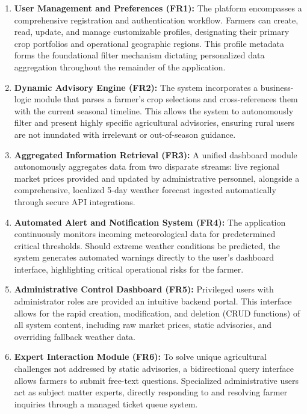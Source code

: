 \begin{enumerate}
    \item \textbf{User Management and Preferences (FR1):} The platform encompasses a comprehensive registration and authentication workflow. Farmers can create, read, update, and manage customizable profiles, designating their primary crop portfolios and operational geographic regions. This profile metadata forms the foundational filter mechanism dictating personalized data aggregation throughout the remainder of the application.
    
    \item \textbf{Dynamic Advisory Engine (FR2):} The system incorporates a business-logic module that parses a farmer's crop selections and cross-references them with the current seasonal timeline. This allows the system to autonomously filter and present highly specific agricultural advisories, ensuring rural users are not inundated with irrelevant or out-of-season guidance.

    \item \textbf{Aggregated Information Retrieval (FR3):} A unified dashboard module autonomously aggregates data from two disparate streams: live regional market prices provided and updated by administrative personnel, alongside a comprehensive, localized 5-day weather forecast ingested automatically through secure API integrations.

    \item \textbf{Automated Alert and Notification System (FR4):} The application continuously monitors incoming meteorological data for predetermined critical thresholds. Should extreme weather conditions be predicted, the system generates automated warnings directly to the user's dashboard interface, highlighting critical operational risks for the farmer.
    
    \item \textbf{Administrative Control Dashboard (FR5):} Privileged users with administrator roles are provided an intuitive backend portal. This interface allows for the rapid creation, modification, and deletion (CRUD functions) of all system content, including raw market prices, static advisories, and overriding fallback weather data.
    
    \item \textbf{Expert Interaction Module (FR6):} To solve unique agricultural challenges not addressed by static advisories, a bidirectional query interface allows farmers to submit free-text questions. Specialized administrative users act as subject matter experts, directly responding to and resolving farmer inquiries through a managed ticket queue system.
\end{enumerate}

